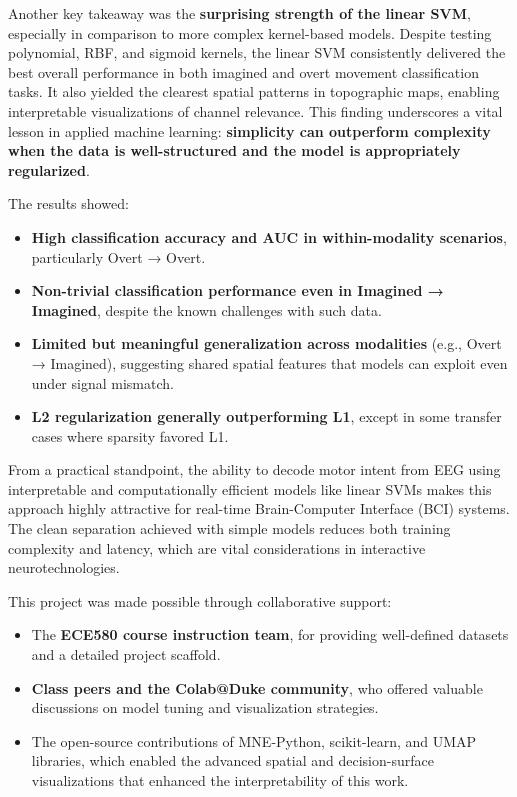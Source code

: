 \documentclass[
  letterpaper,
  DIV=11,
  numbers=noendperiod]{scrartcl}
\providecommand{\tightlist}{%
  \setlength{\itemsep}{0pt}\setlength{\parskip}{0pt}}\usepackage{longtable,booktabs,array}
\begin{document}
Another key takeaway was the \textbf{surprising strength of the linear
SVM}, especially in comparison to more complex kernel-based models.
Despite testing polynomial, RBF, and sigmoid kernels, the linear SVM
consistently delivered the best overall performance in both imagined and
overt movement classification tasks. It also yielded the clearest
spatial patterns in topographic maps, enabling interpretable
visualizations of channel relevance. This finding underscores a vital
lesson in applied machine learning: \textbf{simplicity can outperform
complexity when the data is well-structured and the model is
appropriately regularized}.

The results showed:

\begin{itemize}
\tightlist
\item
  \textbf{High classification accuracy and AUC in within-modality
  scenarios}, particularly Overt → Overt.
\item
  \textbf{Non-trivial classification performance even in Imagined →
  Imagined}, despite the known challenges with such data.
\item
  \textbf{Limited but meaningful generalization across modalities}
  (e.g., Overt → Imagined), suggesting shared spatial features that
  models can exploit even under signal mismatch.
\item
  \textbf{L2 regularization generally outperforming L1}, except in some
  transfer cases where sparsity favored L1.
\end{itemize}

From a practical standpoint, the ability to decode motor intent from EEG
using interpretable and computationally efficient models like linear
SVMs makes this approach highly attractive for real-time Brain-Computer
Interface (BCI) systems. The clean separation achieved with simple
models reduces both training complexity and latency, which are vital
considerations in interactive neurotechnologies.

This project was made possible through collaborative support:

\begin{itemize}
\tightlist
\item
  The \textbf{ECE580 course instruction team}, for providing
  well-defined datasets and a detailed project scaffold.
\item
  \textbf{Class peers and the Colab@Duke community}, who offered
  valuable discussions on model tuning and visualization strategies.
\item
  The open-source contributions of MNE-Python, scikit-learn, and UMAP
  libraries, which enabled the advanced spatial and decision-surface
  visualizations that enhanced the interpretability of this work.
\end{itemize}
\end{document}

